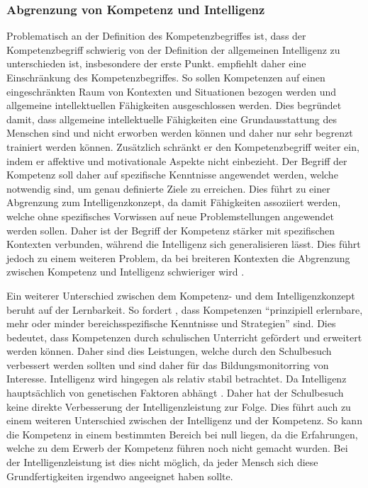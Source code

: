 \subsubsection*{Abgrenzung von Kompetenz und Intelligenz}
Problematisch an der Definition des Kompetenzbegriffes ist, dass der Kompetenzbegriff schwierig von der Definition der allgemeinen Intelligenz zu unterschieden ist, insbesondere der erste Punkt. \citet{Weinert2001b} empfiehlt daher eine Einschränkung des Kompetenzbegriffes. So sollen Kompetenzen auf einen eingeschränkten Raum von Kontexten und Situationen bezogen werden und allgemeine intellektuellen Fähigkeiten ausgeschlossen werden. Dies begründet \citet{Weinert2001b} damit, dass allgemeine intellektuelle Fähigkeiten eine Grundausstattung des Menschen sind und nicht erworben werden können und daher nur sehr begrenzt trainiert werden können. Zusätzlich schränkt er den Kompetenzbegriff weiter ein, indem er affektive und motivationale Aspekte nicht einbezieht. Der Begriff der Kompetenz soll daher auf spezifische Kenntnisse angewendet werden, welche notwendig sind, um genau definierte Ziele zu erreichen. Dies führt zu einer Abgrenzung zum Intelligenzkonzept, da damit Fähigkeiten assoziiert werden, welche ohne spezifisches Vorwissen auf neue Problemstellungen angewendet werden sollen. Daher ist der Begriff der Kompetenz stärker mit spezifischen Kontexten verbunden, während die Intelligenz sich generalisieren lässt. Dies führt jedoch zu einem weiteren Problem, da bei breiteren Kontexten die Abgrenzung zwischen Kompetenz und Intelligenz schwieriger wird \citep{Hartig2006}.


Ein weiterer Unterschied zwischen dem Kompetenz- und dem Intelligenzkonzept beruht auf der Lernbarkeit. So fordert \citet[S. 22]{Baumert2001}, dass Kompetenzen "`prinzipiell erlernbare, mehr oder minder bereichsspezifische Kenntnisse und Strategien"' sind. Dies bedeutet, dass Kompetenzen durch schulischen Unterricht gefördert und erweitert werden können. Daher sind dies Leistungen, welche durch den Schulbesuch verbessert werden sollten und sind daher für das Bildungsmonitorring von Interesse. Intelligenz wird hingegen als relativ stabil betrachtet. Da Intelligenz hauptsächlich von genetischen Faktoren abhängt \citep{Shakeshaft2013}. Daher hat der Schulbesuch keine direkte Verbesserung der Intelligenzleistung zur Folge. Dies führt auch zu einem weiteren Unterschied zwischen der Intelligenz und der Kompetenz. So kann die Kompetenz in einem bestimmten Bereich bei null liegen, da die Erfahrungen, welche zu dem Erwerb der Kompetenz führen noch nicht gemacht wurden. Bei der Intelligenzleistung ist dies nicht möglich, da jeder Mensch sich diese Grundfertigkeiten irgendwo angeeignet haben sollte.


